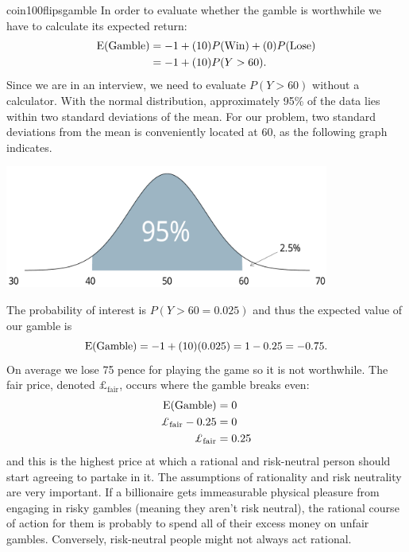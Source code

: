 \begin{answer}{coin100flipsgamble}
In order to evaluate whether the gamble is worthwhile we have to calculate its expected return:
\begin{align*}
  \operatorname{\mathrm{E}}(\text{Gamble}) &= -1 + (10)P(\text{Win})  + (0)P(\text{Lose}) \\
                    &= -1 + (10)P(Y>60)
                    \text{.}
\end{align*}
Since we are in an interview, we need to evaluate $P(Y>60)$ without a calculator.
With the normal distribution, approximately 95\% of the data lies within two standard deviations of the mean.
For our problem, two standard deviations from the mean is conveniently located at 60, as the following graph indicates.
\begin{center}
  \includegraphics[width=0.8\textwidth]{./plots/prettynorm/prettynorm.pdf}
\end{center}
The probability of interest is $P(Y>60 = 0.025)$ and thus the expected value of our gamble is
\[
  \operatorname{\mathrm{E}}(\text{Gamble}) = -1 + (10)(0.025) = 1 - 0.25 = -0.75
  \text{.}
\]
On average we lose 75 pence for playing the game so it is not worthwhile.
The fair price, denoted $\pounds_{\text{fair}}$, occurs where the gamble breaks even:
\begin{align*}
  \E(\text{Gamble})     &=  0    \\
  \pounds_{\text{fair}} - 0.25 &=  0    \\
  \pounds_{\text{fair}}        &=  0.25
\end{align*}
and this is the highest price at which a
rational and risk-neutral person should start agreeing to partake in it.
The assumptions of rationality and risk neutrality are very important.
If a billionaire gets immeasurable physical pleasure from engaging in risky gambles (meaning they aren't risk neutral), the rational course of action for them is probably to spend all of their excess money on unfair gambles.
Conversely, risk-neutral people might not always act rational.

\end{answer}
